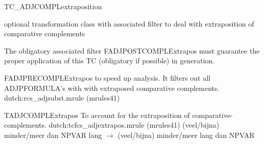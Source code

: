 \begin{mruleclass}{TC\_ADJCOMPLextraposition}
\begin{classdescr}
\kind optional transformation class with associated filter
\classtask to deal with extraposition of comparative complements
\classremarks

\begin{filters}
\item The obligatory associated filter FADJPOSTCOMPLExtrapos  
must guarantee the proper application of this TC (obligatory
if possible) in generation. 

\end{filters}
\begin{speedrules}
\begin{member}
 FADJPRECOMPLExtrapos
 to speed up analysis. It filters out all ADJPFORMULA's
with with extraposed comparative complements.
\file dutch:rcs\_adjsubst.mrule (mrules41)
\end{member}
\end{speedrules}



\noplannedrules

\norulesnotince

\end{classdescr}
\begin{members}

\begin{member}
 TADJCOMPLExtrapos
 To account for the extraposition of comparative-complements.
\file dutch:tcfcs\_adjextrapos.mrule (mrules41)
\semantics \nosemantics
\example (veel/bijna) minder/meer dan NPVAR lang 
$\rightarrow$
(veel/bijna) minder/meer lang dan NPVAR
\remarks\mbox{}


\end{member}
\end{members}
\end{mruleclass}
